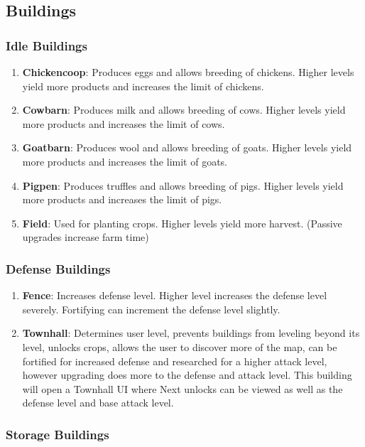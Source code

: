\documentclass[12pt]{article}
\begin{document}
\subsection{Buildings}

\subsubsection{Idle Buildings}

\begin{enumerate}
    \item \textbf{Chickencoop}: Produces eggs and allows breeding of chickens. Higher levels yield more products and increases the limit of chickens.
    \item \textbf{Cowbarn}: Produces milk and allows breeding of cows. Higher levels yield more products and increases the limit of cows.
    \item \textbf{Goatbarn}: Produces wool and allows breeding of goats. Higher levels yield more products and increases the limit of goats.
    \item \textbf{Pigpen}: Produces truffles and allows breeding of pigs. Higher levels yield more products and increases the limit of pigs.
    \item \textbf{Field}: Used for planting crops. Higher levels yield more harvest. (Passive upgrades increase farm time)
\end{enumerate}

\subsubsection{Defense Buildings}

\begin{enumerate}
    \item \textbf{Fence}:
    Increases defense level. Higher level increases the defense level severely. Fortifying can increment the defense level slightly.
    \item \textbf{Townhall}: Determines user level, prevents buildings from leveling beyond its level, unlocks crops, allows the user to discover more of the map, can be fortified for increased defense and researched for a higher attack level, however upgrading does more to the defense and attack level. This building will open a Townhall UI where Next unlocks can be viewed as well as the defense level and base attack level.
\end{enumerate}

\subsubsection{Storage Buildings}
\end{document}
